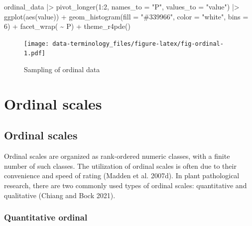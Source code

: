 \documentclass[
  letterpaper,
]{book}
\newenvironment{Shaded}{\begin{snugshade}}{\end{snugshade}}
\newcommand{\AttributeTok}[1]{\textcolor[rgb]{0.40,0.45,0.13}{#1}}
\newcommand{\DecValTok}[1]{\textcolor[rgb]{0.68,0.00,0.00}{#1}}
\newcommand{\FunctionTok}[1]{\textcolor[rgb]{0.28,0.35,0.67}{#1}}
\newcommand{\NormalTok}[1]{\textcolor[rgb]{0.00,0.23,0.31}{#1}}
\newcommand{\SpecialCharTok}[1]{\textcolor[rgb]{0.37,0.37,0.37}{#1}}
\newcommand{\StringTok}[1]{\textcolor[rgb]{0.13,0.47,0.30}{#1}}
\begin{document}
\begin{Shaded}
\begin{Highlighting}[]
\NormalTok{ordinal\_data }\SpecialCharTok{|\textgreater{}}
  \FunctionTok{pivot\_longer}\NormalTok{(}\DecValTok{1}\SpecialCharTok{:}\DecValTok{2}\NormalTok{, }\AttributeTok{names\_to =} \StringTok{"P"}\NormalTok{,}
               \AttributeTok{values\_to =} \StringTok{"value"}\NormalTok{) }\SpecialCharTok{|\textgreater{}}
  \FunctionTok{ggplot}\NormalTok{(}\FunctionTok{aes}\NormalTok{(value)) }\SpecialCharTok{+}
  \FunctionTok{geom\_histogram}\NormalTok{(}\AttributeTok{fill =} \StringTok{"\#339966"}\NormalTok{,}
                 \AttributeTok{color =} \StringTok{"white"}\NormalTok{,}
                 \AttributeTok{bins =} \DecValTok{6}\NormalTok{) }\SpecialCharTok{+}
  \FunctionTok{facet\_wrap}\NormalTok{( }\SpecialCharTok{\textasciitilde{}}\NormalTok{ P) }\SpecialCharTok{+}
  \FunctionTok{theme\_r4pde}\NormalTok{()}
\end{Highlighting}
\end{Shaded}

\begin{figure}

\texttt{[image: data-terminology\_files/figure-latex/fig-ordinal-1.pdf]} \hfill{}

\caption{\label{fig-ordinal}Sampling of ordinal data}

\end{figure}

\hypertarget{ordinal-scales}{%
\chapter{Ordinal scales}\label{ordinal-scales}}

\hypertarget{ordinal-scales-1}{%
\section{Ordinal scales}\label{ordinal-scales-1}}

Ordinal scales are organized as rank-ordered numeric classes, with a
finite number of such classes. The utilization of ordinal scales is
often due to their convenience and speed of rating (Madden et al.
2007d). In plant pathological research, there are two commonly used
types of ordinal scales: quantitative and qualitative (Chiang and Bock
2021).

\hypertarget{quantitative-ordinal}{%
\subsection{Quantitative ordinal}\label{quantitative-ordinal}}
\end{document}

